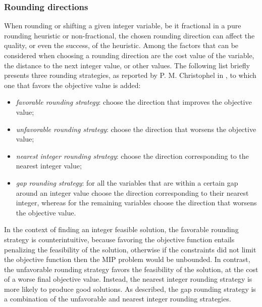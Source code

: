 \documentclass[a4paper,12pt,twoside]{scrbook}
\begin{document}
\subsubsection{Rounding directions}
When rounding or shifting a given integer variable, be it fractional in a pure rounding heuristic or non-fractional, the chosen rounding direction can affect the quality, or even the success, of the heuristic. Among the factors that can be considered when choosing a rounding direction are the cost value of the variable, the distance to the next integer value, or other values. The following list briefly presents three rounding strategies, as reported by P. M. Christophel in \cite{christophel2005}, to which one that favors the objective value is added:
\begin{itemize}
	\item \textit{favorable rounding strategy}: choose the direction that improves the objective value;
	\item \textit{unfavorable rounding strategy}: choose the direction that worsens the objective value;
	\item \textit{nearest integer rounding strategy}: choose the direction corresponding to the nearest integer value;
	\item \textit{gap rounding strategy}: for all the variables that are within a certain gap around an integer value choose the direction corresponding to their nearest integer, whereas for the remaining variables choose the direction that worsens the objective value.
\end{itemize}
In the context of finding an integer feasible solution, the favorable rounding strategy is counterintuitive, because favoring the objective function entails penalizing the feasibility of the solution, otherwise if the constraints did not limit the objective function then the MIP problem would be unbounded. In contrast, the unfavorable rounding strategy favors the feasibility of the solution, at the cost of a worse final objective value. Instead, the nearest integer rounding strategy is more likely to produce good solutions. As described, the gap rounding strategy is a combination of the unfavorable and nearest integer rounding strategies. \par

\end{document}
